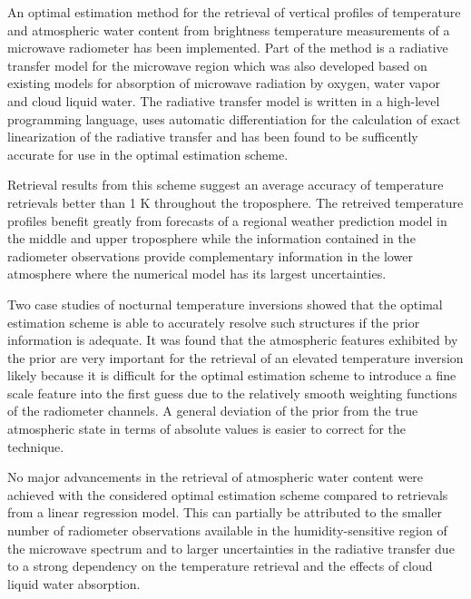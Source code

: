 \startsection[title=Conclusions]

    An optimal estimation method for the retrieval of vertical profiles of
    temperature and atmospheric water content from brightness temperature
    measurements of a microwave radiometer has been implemented. Part of the
    method is a radiative transfer model for the microwave region which was
    also developed based on existing models for absorption of microwave
    radiation by oxygen, water vapor and cloud liquid water. The radiative
    transfer model is written in a high-level programming language, uses
    automatic differentiation for the calculation of exact linearization of the
    radiative transfer and has been found to be sufficently accurate for use in
    the optimal estimation scheme.

    Retrieval results from this scheme suggest an average accuracy of
    temperature retrievals better than 1 K throughout the troposphere. The
    retreived temperature profiles benefit greatly from forecasts of a
    regional weather prediction model in the middle and upper troposphere
    while the information contained in the radiometer observations provide
    complementary information in the lower atmosphere where the numerical model
    has its largest uncertainties.
    
    Two case studies of nocturnal temperature inversions showed that the
    optimal estimation scheme is able to accurately resolve such structures
    if the prior information is adequate. It was found that the atmospheric
    features exhibited by the prior are very important for the retrieval
    of an elevated temperature inversion likely because it is difficult for
    the optimal estimation scheme to introduce a fine scale feature into
    the first guess due to the relatively smooth weighting functions of the
    radiometer channels. A general deviation of the prior from the true
    atmospheric state in terms of absolute values is easier to correct
    for the technique.

    No major advancements in the retrieval of atmospheric water content were
    achieved with the considered optimal estimation scheme compared to
    retrievals from a linear regression model. This can partially be attributed
    to the smaller number of radiometer observations available in the
    humidity-sensitive region of the microwave spectrum and to larger
    uncertainties in the radiative transfer due to a strong dependency on
    the temperature retrieval and the effects of cloud liquid water absorption.

